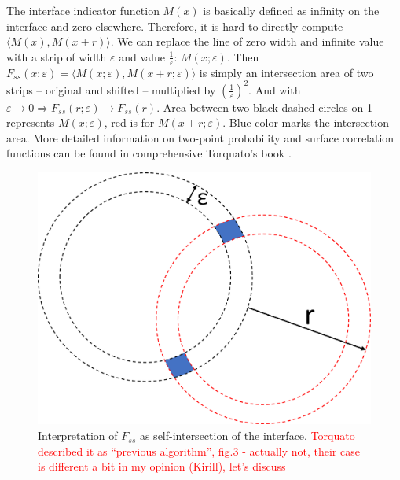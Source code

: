\documentclass[reprint,amsmath,amssymb,aps,pre,showkeys,showpacs]{revtex4-1}
\begin{document}
The interface indicator function $M(x)$ is basically defined as infinity on the
interface and zero elsewhere. Therefore, it is hard to directly compute
$\langle M(x), M(x + r) \rangle$. We can replace the line of zero width and infinite value
with a strip of width $\varepsilon$ and value $\frac{1}{\varepsilon}$: $M(x; \varepsilon)$.
Then $F_{ss}(x; \varepsilon) = \langle M(x; \varepsilon), M(x + r; \varepsilon) \rangle$
is simply an intersection area of two strips -- original and shifted --
multiplied by $(\frac{1}{\varepsilon})^2$.
And with $\varepsilon \to 0 \Rightarrow F_{ss}(r; \varepsilon) \to F_{ss}(r)$.
Area between two black dashed circles on \cref{fig:Fss-explained} represents
$M(x; \varepsilon)$, red is for $M(x + r; \varepsilon)$. Blue color marks the
intersection area. More detailed information on two-point probability and
surface correlation functions can be found in comprehensive Torquato's book
\cite{Torquato_book}.

\begin{figure}
  \centering
  \includegraphics[width=0.9\linewidth]{images/Fss.png}
  \caption[]{Interpretation of $F_{ss}$ as self-intersection of the interface.
    \textcolor{red}{Torquato described it as ``previous algorithm'', fig.3 - actually not, their case is different a bit in my opinion (Kirill), let's discuss}}
  \label{fig:Fss-explained}
\end{figure}
\end{document}
